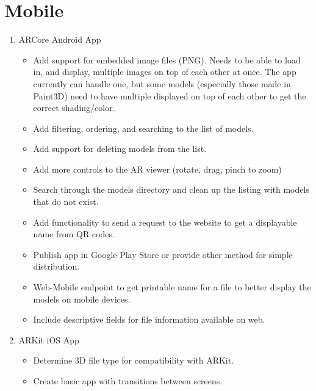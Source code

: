     \section{Mobile}
        \begin{enumerate}
            \item ARCore Android App
            \begin{itemize}
                \item Add support for embedded image files (PNG). Needs to be able to load in, and display, multiple images on top of each other at once.  The app currently can handle one, but some models (especially those made in Paint3D) need to have multiple displayed on top of each other to get the correct shading/color.

                \item Add filtering, ordering, and searching to the list of models.

                \item Add support for deleting models from the list.

                \item Add more controls to the AR viewer (rotate, drag, pinch to zoom)

                \item Search through the models directory and clean up the listing with models that do not exist.

                \item Add functionality to send a request to the website to get a displayable name from QR codes.

                \item Publish app in Google Play Store or provide other method for simple distribution.
 
                \item Web-Mobile endpoint to get printable name for a file to better display the models on mobile devices.

                \item Include descriptive fields for file information available on web. 

            \end{itemize}
            \item ARKit iOS App
            \begin{itemize}
                \item Determine 3D file type for compatibility with ARKit.

                \item Create basic app with transitions between screens.


\end{itemize}
\end{enumerate}
